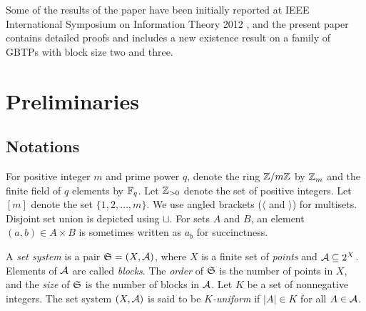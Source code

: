 \documentclass[draft, 11pt]{article}
\begin{document}
Some of the results of the paper have been initially reported 
at IEEE International Symposium on Information Theory 2012 \cite{Cheeetal:2012b},
and the present paper contains detailed proofs and 
includes a new existence result on a family of GBTPs with block size two and three.



 \section{Preliminaries}

 \subsection{Notations}

For positive integer $m$ and prime power $q$,
 denote the ring $\mathbb Z/m\mathbb Z$  by $\mathbb Z_m$ 
 and the finite field of $q$ elements by $\mathbb F_q$.
 Let $\mathbb Z_{>0}$ denote the set of positive integers.
Let $[m]$ denote the set $\{1,2,\ldots, m\}$. 
We use angled brackets ($\langle$ and  $\rangle$) for multisets. Disjoint set
union is depicted using $\sqcup$.
For sets $A$ and $B$, an element $(a,b)\in A\times B$ is sometimes
written as $a_b$ for succinctness.



A {\em set system} is a pair ${\frak S}=(X,\mathcal A)$, where $X$ is a
finite set of {\em points} and $\mathcal A\subseteq 2^X$. Elements of $\mathcal A$
are called {\em blocks}. The {\em order} of $\frak S$ is the number
of points in $X$, and the {\em size} of $\frak S$ is the number of
blocks in $\mathcal A$. Let $K$ be a set of nonnegative integers. The set
system $(X,\mathcal A)$ is said to be {\em $K$-uniform} if $|A|\in K$ for
all $A\in\mathcal A$.
\end{document}
